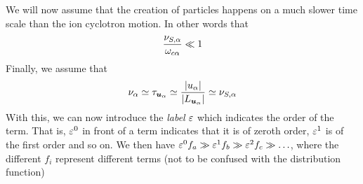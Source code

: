 %
We will now assume that the creation of particles happens on a much slower time  scale than the ion cyclotron motion.
In other words that
%
\begin{align*}
 \frac{
     \nu_{S,\alpha}
 }{ \omega_{c\alpha}}
 \ll
 1
\end{align*}
%
Finally, we assume that
%
\begin{align*}
 \nu_\alpha \simeq
 \tau_{\boldsymbol{u}_\alpha} \simeq
 \frac{\left|u_{\alpha}\right|}{\left|L_{\boldsymbol{u}_\alpha}\right|}\simeq
 \nu_{S,\alpha}
\end{align*}
%
With this, we can now introduce the \emph{label} $\varepsilon$ which indicates the order of the term.
That is, $\varepsilon^0$ in front of a term indicates that it is of zeroth order, $\varepsilon^1$ is of the first order and so on.
We then have $\varepsilon^0 f_a \gg \varepsilon^1 f_b \gg \varepsilon^2 f_c \gg \ldots$, where the different $f_i$ represent different terms (not to be confused with the distribution function)

